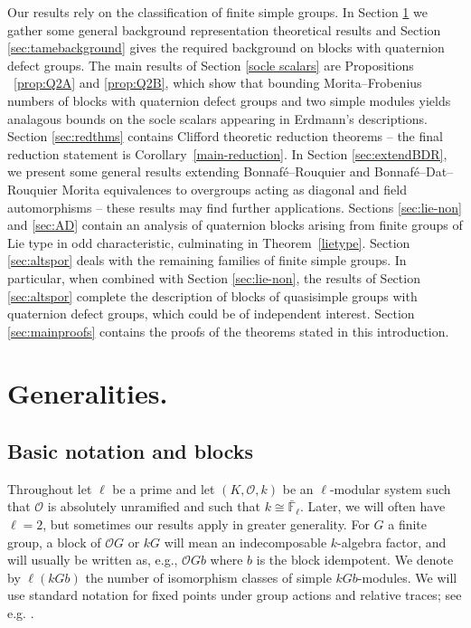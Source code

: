 \documentclass{amsart}
\theoremstyle{plain}\newtheorem{Theorem}{Theorem}[section]
\theoremstyle{plain}\newtheorem{Conjecture}[Theorem]{Conjecture}
\theoremstyle{plain}\newtheorem{Corollary}[Theorem]{Corollary}
\theoremstyle{plain}\newtheorem{Lemma}[Theorem]{Lemma}
\theoremstyle{plain}\newtheorem{Proposition}[Theorem]{Proposition}
\theoremstyle{definition}\newtheorem{Definition}[Theorem]{Definition}
\theoremstyle{definition}\newtheorem{Example}[Theorem]{Example}
\theoremstyle{definition}\newtheorem{Examples}[Theorem]{Examples}
\theoremstyle{definition}\newtheorem{Exercise}[Theorem]{Exercise}
\theoremstyle{definition}\newtheorem{Notation}[Theorem]{Notation}
\theoremstyle{definition}\newtheorem{Remark}[Theorem]{Remark}
\theoremstyle{definition}\newtheorem{Remarks}[Theorem]{Remarks}
\def\CO{{\mathcal{O}}}    \def\OPE{{\mathcal{O}(P\rtimes E)}}
\numberwithin{equation}{section}
\begin{document}
 Our results rely on the classification of finite simple groups. In Section \ref{sec:generalities} we gather some general background representation theoretical  results  and  Section  \ref{sec:tamebackground} gives  the required background on blocks with quaternion defect groups.   The main results of Section \ref{socle scalars} are Propositions ~\ref{prop:Q2A} and \ref{prop:Q2B}, which show that bounding Morita--Frobenius numbers of blocks with quaternion defect groups and two simple modules yields  analagous bounds on the socle scalars appearing in Erdmann's descriptions. Section \ref{sec:redthms} contains Clifford theoretic  
 reduction theorems -- the final reduction statement is  Corollary~\ref{main-reduction}. In Section \ref{sec:extendBDR}, we  present  some  general results  extending Bonnaf\'e--Rouquier  and  Bonnaf\'e--Dat--Rouquier Morita equivalences  to overgroups  acting as diagonal and field automorphisms -- these results  may  find  further applications.  Sections \ref{sec:lie-non} and \ref{sec:AD}  contain  an  analysis  of quaternion  blocks   arising from finite groups of Lie type in odd characteristic,  culminating in Theorem~\ref{lietype}. 
  Section \ref{sec:altspor}  deals with  the remaining   
 families of finite simple groups. In particular, when combined with Section \ref{sec:lie-non}, the results of Section \ref{sec:altspor} complete the description of blocks of quasisimple groups with quaternion defect groups, which could be of independent interest.
 Section \ref{sec:mainproofs}  contains the proofs of the theorems stated in this introduction.    




\section{Generalities.}\label{sec:generalities} 

\subsection{Basic notation and blocks}

Throughout let $\ell $  be a prime and let $(K, \CO, k) $  be an $\ell$-modular  system  such that $\CO$ is absolutely  unramified  and such that $k \cong \bar{\mathbb {F}}_{\ell}$. Later, we will often have $\ell=2$, but sometimes our results apply in greater generality. For $G$ a finite group, a block of $\CO G$ or $kG$ will mean an indecomposable  $k$-algebra  factor, and will usually be written as, e.g., $\CO Gb$ where $b$ is the block idempotent. We denote by $\ell(kGb)$ the number of isomorphism classes of simple $kGb$-modules. We will use standard notation for
fixed points under group actions and relative traces; see e.g. \cite[\S 2.5]{LiBookI}.
\end{document}
